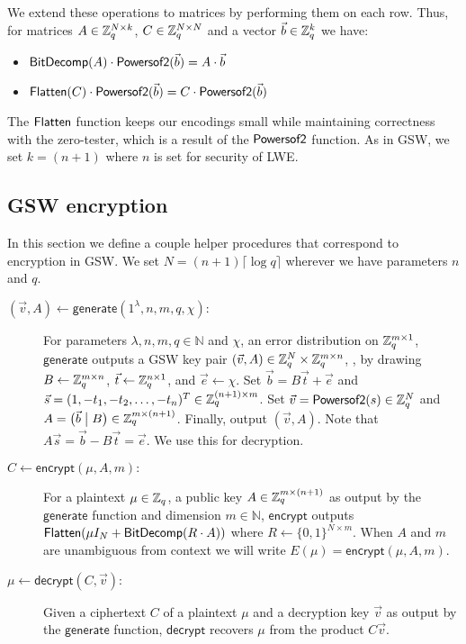 We extend these operations to matrices by performing them on each row.  Thus, for matrices $A \in \mathbb{Z}_q^{N \times k}$, $C \in \mathbb{Z}_q^{N \times N}$ and a vector $\vec{b} \in \mathbb{Z}_q^k$ we have:

\begin{itemize}
\item $\mathsf{BitDecomp}(A)\cdot\mathsf{Powersof2}(\vec{b}) = A\cdot\vec{b}$
\item $\mathsf{Flatten}(C)\cdot\mathsf{Powersof2}(\vec{b}) = C\cdot\mathsf{Powersof2}(\vec{b})$
\end{itemize}

The $\mathsf{Flatten}$ function keeps our encodings small while maintaining correctness with the zero-tester, which is a result of the $\mathsf{Powersof2}$ function.  As in GSW, we set $k = (n+1)$ where $n$ is set for security of LWE.

\subsection{GSW encryption}

In this section we define a couple helper procedures that correspond to encryption in GSW.  We set $N = (n+1)\lceil \log q\rceil$ wherever we have parameters $n$ and $q$.

\begin{description}

\item[$(\vec{v}, A) \leftarrow \mathsf{generate}(1^\lambda, n, m, q, \chi):$] For parameters $\lambda, n, m, q \in \mathbb{N}$ and $\chi$, an error distribution on $\mathbb{Z}_q^{m\times 1}$, $\mathsf{generate}$ outputs a GSW key pair $(\vec{v},A) \in \mathbb{Z}_q^N \times \mathbb{Z}_q^{m \times n}$, , by drawing $B \leftarrow \mathbb{Z}_q^{m\times n}$, $\vec{t} \leftarrow \mathbb{Z}_q^{n \times 1}$, and $\vec{e}\leftarrow \chi$.  Set $\vec{b} = B\vec{t} + \vec{e}$ and $\vec{s} = (1, -t_1, -t_2, \ldots, -t_n)^T \in \mathbb{Z}_q^{(n+1)\times m}$.  Set $\vec{v} = \mathsf{Powersof2}(s) \in \mathbb{Z}_q^N$ and $A = \big(\vec{b} \; \big| \; B\big) \in \mathbb{Z}_q^{m \times (n+1)}$.  Finally, output $(\vec{v}, A)$.  Note that $A\vec{s} = \vec{b} - B\vec{t} = \vec{e}$.  We use this for decryption.

\item[$C \leftarrow \mathsf{encrypt}(\mu, A,m):$]  For a plaintext $\mu \in \mathbb{Z}_q$, a public key $A \in \mathbb{Z}_q^{m \times (n+1)}$ as output by the $\mathsf{generate}$ function and dimension $m \in \mathbb{N}$, $\mathsf{encrypt}$ outputs $\mathsf{Flatten}(\mu I_N + \mathsf{BitDecomp}(R\cdot A))$ where $R \leftarrow \{0,1\}^{N\times m}$.  When $A$ and $m$ are unambiguous from context we will write $E(\mu) = \mathsf{encrypt}(\mu, A, m)$.

\item[$\mu \leftarrow \mathsf{decrypt}(C, \vec{v}):$]  Given a ciphertext $C$ of a plaintext $\mu$ and a decryption key $\vec{v}$ as output by the $\mathsf{generate}$ function, $\mathsf{decrypt}$ recovers $\mu$ from the product $C\vec{v}$.  
\end{description}

